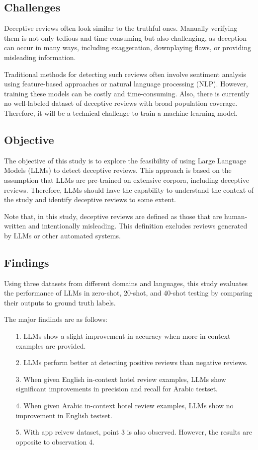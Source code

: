 \documentclass[sigconf, nonacm]{acmart}
\theoremstyle{definition}
\begin{document}
\subsection{Challenges}
Deceptive reviews often look similar to the truthful ones. Manually verifying them is not only tedious and time-consuming but also challenging, as deception can occur in many ways, including exaggeration, downplaying flaws, or providing misleading information.

Traditional methods for detecting such reviews often involve sentiment analysis using feature-based approaches or natural language processing (NLP). However, training these models can be costly and time-consuming. Also, there is currently no well-labeled dataset of deceptive reviews with broad population coverage. Therefore, it will be a technical challenge to train a machine-learning model.

\subsection{Objective}
The objective of this study is to explore the feasibility of using Large Language Models (LLMs) to detect deceptive reviews. This approach is based on the assumption that LLMs are pre-trained on extensive corpora, including deceptive reviews. Therefore, LLMs should have the capability to understand the context of the study and identify deceptive reviews to some extent.

Note that, in this study, deceptive reviews are defined as those that are human-written and intentionally misleading. This definition excludes reviews generated by LLMs or other automated systems.

\subsection{Findings}
Using three datasets from different domains and languages, this study evaluates the performance of LLMs in zero-shot, 20-shot, and 40-shot testing by comparing their outputs to ground truth labels.

\noindent The major findinds are as follows:
\begin{itemize}
  \item[1.] LLMs show a slight improvement in accuracy when more in-context examples are provided.
  \item[2.] LLMs perform better at detecting positive reviews than negative reviews.
  \item[3.] When given English in-context hotel review examples, LLMs show significant improvements in precision and recall for Arabic testset.
  \item[4.] When given Arabic in-context hotel review examples, LLMs show no improvement in English testset.
  \item[5.] With app reivew dataset, point 3 is also observed. However, the results are opposite to observation 4.
\end{itemize}
\end{document}

